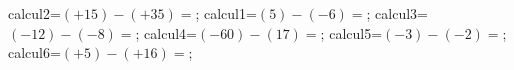 \documentclass[exercice]{thedocument}%
\begin{document}
%
\>calcul2=$(+15)-(+35)=$;%
\>calcul1=$(5)-(-6)=$;%
\>calcul3=$(-12)-(-8)=$;%
\>calcul4=$(-60)-(17)=$;%
\>calcul5=$(-3)-(-2)=$;%
\>calcul6=$(+5)-(+16)=$;%
%
\end{document}
